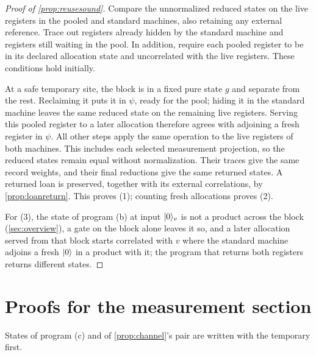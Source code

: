 \documentclass[acmsmall,screen,review,anonymous,nonacm]{acmart}
\begin{document}
\begin{proof}[Proof of \cref{prop:reusesound}]
Compare the unnormalized reduced states on the live registers in the
pooled and standard machines, also retaining any external reference.
Trace out registers already hidden by the standard machine and registers
still waiting in the pool. In addition, require each pooled register to
be in its declared allocation state and uncorrelated with the live
registers. These conditions hold initially.

At a safe temporary site, the block is in a fixed pure state $g$ and
separate from the rest. Reclaiming it puts it in $\psi$, ready for the pool;
hiding it in the standard machine leaves the same reduced state on the
remaining live registers. Serving this pooled register to a later
allocation therefore agrees with adjoining a fresh register in $\psi$.
All other steps apply the same operation to the live registers of both
machines. This includes each selected measurement projection, so the
reduced states remain equal without normalization. Their traces give the
same record weights, and their final reductions give the same returned
states. A returned loan is preserved, together with its external
correlations, by \cref{prop:loanreturn}. This proves (1); counting fresh
allocations proves (2).

For (3), the state of program (b) at input $\lvert 0 \rangle_v$ is not a product
across the block (\cref{sec:overview}), a gate on the block alone leaves it
so, and a later allocation served from that block starts correlated with $v$
where the standard machine adjoins a fresh $\lvert 0 \rangle$ in a product with it;
the program that returns both registers returns different states.
\end{proof}

\section{Proofs for the measurement section}\label{app:measurement}

States of program (c) and of \cref{prop:channel}'s pair are written with
the temporary first.
\end{document}
